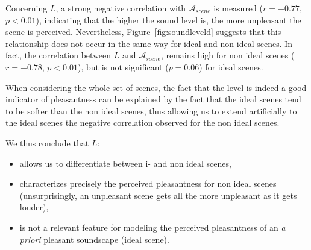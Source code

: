 \documentclass[12pt]{elsarticle}
\begin{document}

Concerning $L$, a strong negative correlation with $\mathcal{A}_{scene}$ is measured ($r=-0.77$, $p<0.01$), indicating that the higher the sound level is, the more unpleasant the scene is perceived. Nevertheless, Figure~\ref{fig:soundleveld} suggests that this relationship does not occur in the same way for ideal and non ideal scenes. In fact, the correlation between $L$ and $\mathcal{A}_{scene}$, remains high for non ideal scenes ($r=-0.78$, $p<0.01$), but is not significant ($p=0.06$) for ideal scenes.


When considering the whole set of scenes, the fact that the level is indeed a good indicator of pleasantness can be explained by the fact that the ideal scenes tend to be softer than the non ideal scenes, thus allowing us to extend artificially to the ideal scenes the negative correlation observed for the non ideal scenes.

%

We thus conclude that $L$:

\begin{itemize}
\item allows us to differentiate between i- and non ideal scenes,
\item characterizes precisely the perceived pleasantness for non ideal scenes (unsurprisingly, an unpleasant scene gets all the more unpleasant as it gets louder),
\item is not a relevant feature for modeling the perceived pleasantness of an \textit{a priori} pleasant soundscape (ideal scene).
\end{itemize}
\end{document}
